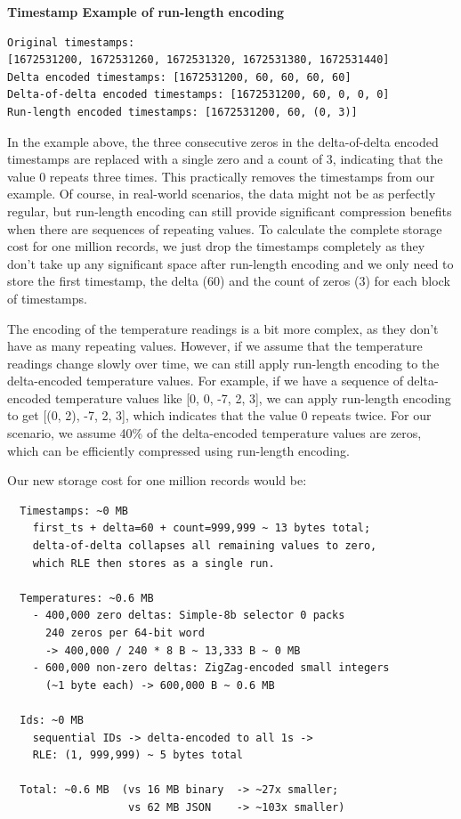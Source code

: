 \textbf{Timestamp Example of run-length encoding}
\begin{verbatim}
Original timestamps:
[1672531200, 1672531260, 1672531320, 1672531380, 1672531440]
Delta encoded timestamps: [1672531200, 60, 60, 60, 60]
Delta-of-delta encoded timestamps: [1672531200, 60, 0, 0, 0]
Run-length encoded timestamps: [1672531200, 60, (0, 3)]
\end{verbatim}

In the example above, the three consecutive zeros in the delta-of-delta encoded
timestamps are replaced with a single zero and a count of 3, indicating that
the value 0 repeats three times. This practically removes the timestamps from
our example. Of course, in real-world scenarios, the data might not be as
perfectly regular, but run-length encoding can still provide significant
compression benefits when there are sequences of repeating values. To calculate
the complete storage cost for one million records, we just drop the timestamps
completely as they don't take up any significant space after run-length
encoding and we only need to store the first timestamp, the delta (60) and the
count of zeros (3) for each block of timestamps.

The encoding of the temperature readings is a bit more complex, as they don't
have as many repeating values. However, if we assume that the temperature
readings change slowly over time, we can still apply run-length encoding to the
delta-encoded temperature values. For example, if we have a sequence of
delta-encoded temperature values like [0, 0, -7, 2, 3], we can apply run-length
encoding to get [(0, 2), -7, 2, 3], which indicates that the value 0 repeats
twice. For our scenario, we assume 40\% of the delta-encoded temperature values
are zeros, which can be efficiently compressed using run-length encoding.

Our new storage cost for one million records would be:
\begin{verbatim}
  Timestamps: ~0 MB
    first_ts + delta=60 + count=999,999 ~ 13 bytes total;
    delta-of-delta collapses all remaining values to zero,
    which RLE then stores as a single run.

  Temperatures: ~0.6 MB
    - 400,000 zero deltas: Simple-8b selector 0 packs
      240 zeros per 64-bit word
      -> 400,000 / 240 * 8 B ~ 13,333 B ~ 0 MB
    - 600,000 non-zero deltas: ZigZag-encoded small integers
      (~1 byte each) -> 600,000 B ~ 0.6 MB

  Ids: ~0 MB
    sequential IDs -> delta-encoded to all 1s ->
    RLE: (1, 999,999) ~ 5 bytes total

  Total: ~0.6 MB  (vs 16 MB binary  -> ~27x smaller;
                   vs 62 MB JSON    -> ~103x smaller)
\end{verbatim}

